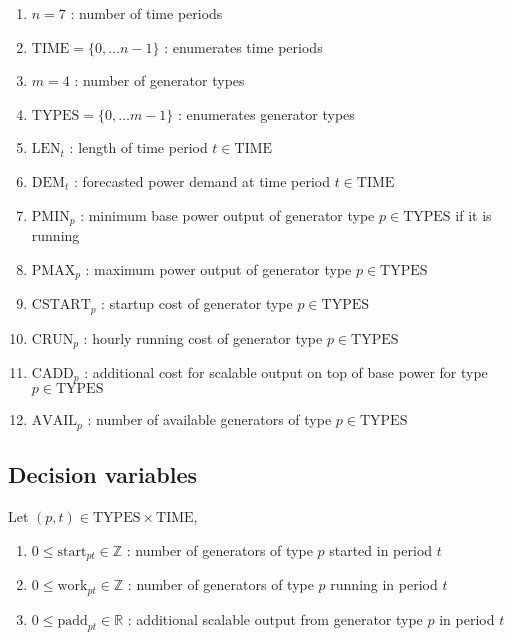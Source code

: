 \documentclass[8pt,oneside]{extarticle}
\newcommand{\Real}{\mathbb{R}}
\newcommand{\Int}{\mathbb{Z}}
\begin{document}
\begin{enumerate}

    \item $n = 7$ : number of time periods
    \item $\mathrm{TIME} = \lbrace 0,\ldots n-1\rbrace$ : enumerates time periods
    \item $m = 4$ : number of generator types
    \item $\mathrm{TYPES} = \lbrace 0,\ldots m-1\rbrace$ : enumerates generator types
    \item $\mathrm{LEN}_t$ : length of time period $t\in\mathrm{TIME}$
    \item $\mathrm{DEM}_t$ : forecasted power demand at time period $t\in\mathrm{TIME}$
    \item $\mathrm{PMIN}_p$ : minimum base power output of generator type $p\in\mathrm{TYPES}$ if it is running
    \item $\mathrm{PMAX}_p$ : maximum power output of generator type $p\in\mathrm{TYPES}$
    \item $\mathrm{CSTART}_p$ : startup cost of generator type $p\in\mathrm{TYPES}$
    \item $\mathrm{CRUN}_p$ : hourly running cost of generator type $p\in\mathrm{TYPES}$
    \item $\mathrm{CADD}_p$ : additional cost for scalable output on top of base power for type $p\in\mathrm{TYPES}$
    \item $\mathrm{AVAIL}_p$ : number of available generators of type $p\in\mathrm{TYPES}$

\end{enumerate}

\subsection{Decision variables}

Let $(p, t) \in \mathrm{TYPES}\times\mathrm{TIME}$,

\begin{enumerate}

    \item $0 \leq \mathrm{start}_{pt} \in\Int$ : number of generators of type $p$ started in period $t$
    \item $0 \leq \mathrm{work}_{pt}\in\Int$ : number of generators of type $p$ running in period $t$
    \item $0 \leq \mathrm{padd}_{pt}\in\Real$ : additional scalable output from generator type $p$ in period $t$

\end{enumerate}
\end{document}
